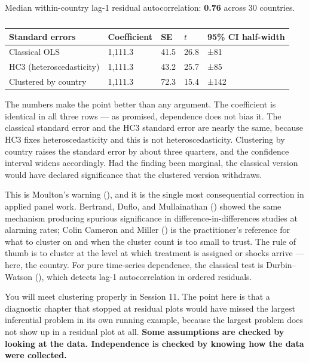 \documentclass[
  letterpaper,
  10pt,
  twoside,
  openright,
  numbers=noenddot,
  chapterprefix=true]{scrbook}
\begin{document}
Median within-country lag-1 residual autocorrelation: \textbf{0.76}
across 30 countries.

\begin{longtable}[]{@{}lllll@{}}

\caption{\label{tbl-clustering}}

\tabularnewline

\toprule\noalign{}
Standard errors & Coefficient & SE & \(t\) & 95\% CI half-width \\
\midrule\noalign{}
\endhead
\bottomrule\noalign{}
\endlastfoot
Classical OLS & 1,111.3 & 41.5 & 26.8 & ±81 \\
HC3 (heteroscedasticity) & 1,111.3 & 43.2 & 25.7 & ±85 \\
Clustered by country & 1,111.3 & 72.3 & 15.4 & ±142 \\

\end{longtable}

The numbers make the point better than any argument. The coefficient is
identical in all three rows --- as promised, dependence does not bias
it. The classical standard error and the HC3 standard error are nearly
the same, because HC3 fixes heteroscedasticity and this is not
heteroscedasticity. Clustering by country raises the standard error by
about three quarters, and the confidence interval widens accordingly.
Had the finding been marginal, the classical version would have declared
significance that the clustered version withdraws.

This is Moulton's warning (),
and it is the single most consequential correction in applied panel
work. Bertrand, Duflo, and Mullainathan
() showed the same mechanism producing
spurious significance in difference-in-differences studies at alarming
rates; Colin Cameron and Miller () is
the practitioner's reference for what to cluster on and when the cluster
count is too small to trust. The rule of thumb is to cluster at the
level at which treatment is assigned or shocks arrive --- here, the
country. For pure time-series dependence, the classical test is
Durbin--Watson (),
which detects lag-1 autocorrelation in ordered residuals.

You will meet clustering properly in Session 11. The point here is that
a diagnostic chapter that stopped at residual plots would have missed
the largest inferential problem in its own running example, because the
largest problem does not show up in a residual plot at all. \textbf{Some
assumptions are checked by looking at the data. Independence is checked
by knowing how the data were collected.}
\end{document}
